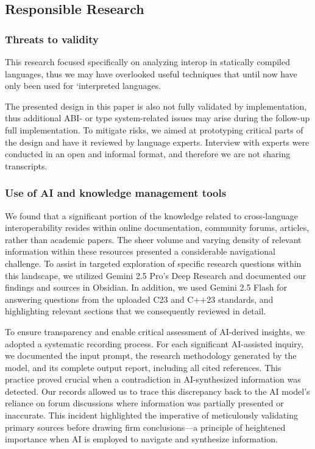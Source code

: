 \subsection{Responsible Research}
\subsubsection{Threats to validity}
This research focused specifically on analyzing interop in statically compiled languages, thus we may have overlooked useful techniques that until now have only been used for `interpreted languages.

The presented design in this paper is also not fully validated by implementation, thus additional ABI- or type system-related issues may arise during the follow-up full implementation. To mitigate risks, we aimed at prototyping critical parts of the design and have it reviewed by language experts. Interview with experts were conducted in an open and informal format, and therefore we are not sharing transcripts.

\subsubsection{Use of AI and knowledge management tools}
We found that a significant portion of the knowledge related to cross-language interoperability resides within online documentation, community forums, articles, rather than academic papers. The sheer volume and varying density of relevant information within these resources presented a considerable navigational challenge. To assist in targeted exploration of specific research questions within this landscape, we utilized Gemini 2.5 Pro's Deep Research and documented our findings and sources in Obsidian. In addition, we used Gemini 2.5 Flash for answering questions from the uploaded C23 and C++23 standards, and highlighting relevant sections that we consequently reviewed in detail.

To ensure transparency and enable critical assessment of AI-derived insights, we adopted a systematic recording process. For each significant AI-assisted inquiry, we documented the input prompt, the research methodology generated by the model, and its complete output report, including all cited references. This practice proved crucial when a contradiction in AI-synthesized information was detected. Our records allowed us to trace this discrepancy back to the AI model's reliance on forum discussions where information was partially presented or inaccurate. This incident highlighted the imperative of meticulously validating primary sources before drawing firm conclusions—a principle of heightened importance when AI is employed to navigate and synthesize information.

